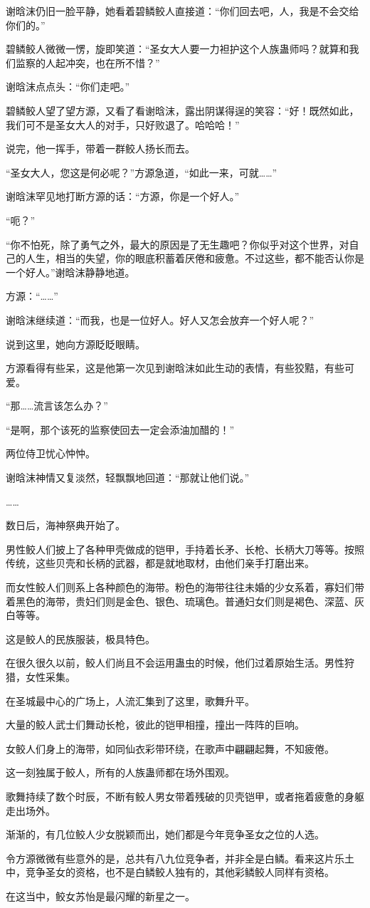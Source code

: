 \begin{this_body}
谢晗沫仍旧一脸平静，她看着碧鳞鲛人直接道：“你们回去吧，人，我是不会交给你们的。”

碧鳞鲛人微微一愣，旋即笑道：“圣女大人要一力袒护这个人族蛊师吗？就算和我们监察的人起冲突，也在所不惜？”

谢晗沫点点头：“你们走吧。”

碧鳞鲛人望了望方源，又看了看谢晗沫，露出阴谋得逞的笑容：“好！既然如此，我们可不是圣女大人的对手，只好败退了。哈哈哈！”

说完，他一挥手，带着一群鲛人扬长而去。

“圣女大人，您这是何必呢？”方源急道，“如此一来，可就……”

谢晗沫罕见地打断方源的话：“方源，你是一个好人。”

“呃？”

“你不怕死，除了勇气之外，最大的原因是了无生趣吧？你似乎对这个世界，对自己的人生，相当的失望，你的眼底积蓄着厌倦和疲惫。不过这些，都不能否认你是一个好人。”谢晗沫静静地道。

方源：“……”

谢晗沫继续道：“而我，也是一位好人。好人又怎会放弃一个好人呢？”

说到这里，她向方源眨眨眼睛。

方源看得有些呆，这是他第一次见到谢晗沫如此生动的表情，有些狡黠，有些可爱。

“那……流言该怎么办？”

“是啊，那个该死的监察使回去一定会添油加醋的！”

两位侍卫忧心忡忡。

谢晗沫神情又复淡然，轻飘飘地回道：“那就让他们说。”

……

数日后，海神祭典开始了。

男性鲛人们披上了各种甲壳做成的铠甲，手持着长矛、长枪、长柄大刀等等。按照传统，这些贝壳和长柄的武器，都是就地取材，由他们亲手打磨出来。

而女性鲛人们则系上各种颜色的海带。粉色的海带往往未婚的少女系着，寡妇们带着黑色的海带，贵妇们则是金色、银色、琉璃色。普通妇女们则是褐色、深蓝、灰白等等。

这是鲛人的民族服装，极具特色。

在很久很久以前，鲛人们尚且不会运用蛊虫的时候，他们过着原始生活。男性狩猎，女性采集。

在圣城最中心的广场上，人流汇集到了这里，歌舞升平。

大量的鲛人武士们舞动长枪，彼此的铠甲相撞，撞出一阵阵的巨响。

女鲛人们身上的海带，如同仙衣彩带环绕，在歌声中翩翩起舞，不知疲倦。

这一刻独属于鲛人，所有的人族蛊师都在场外围观。

歌舞持续了数个时辰，不断有鲛人男女带着残破的贝壳铠甲，或者拖着疲惫的身躯走出场外。

渐渐的，有几位鲛人少女脱颖而出，她们都是今年竞争圣女之位的人选。

令方源微微有些意外的是，总共有八九位竞争者，并非全是白鳞。看来这片乐土中，竞争圣女的资格，也不是白鳞鲛人独有的，其他彩鳞鲛人同样有资格。

在这当中，鲛女苏怡是最闪耀的新星之一。

\end{this_body}

